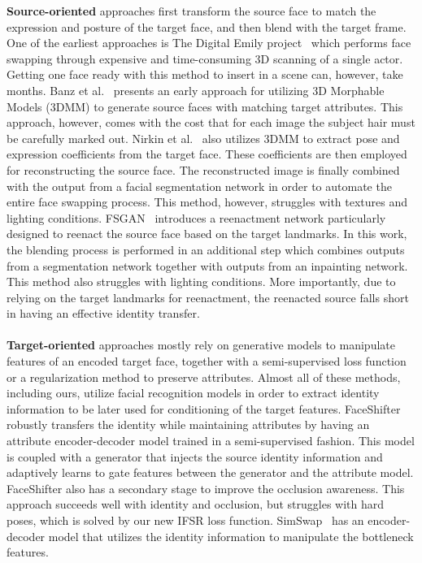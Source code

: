 \documentclass[10pt,twocolumn,letterpaper]{article}
\begin{document}
\textbf{Source-oriented} approaches first transform the source face to match the expression and posture of the target face, and then blend with the target frame. One of the earliest approaches is The Digital Emily project~\cite{3d_emily} which performs face swapping through expensive and time-consuming 3D scanning of a single actor. Getting one face ready with this method to insert in a scene can, however, take months. Banz et al.~\cite{faceexchange} presents an early approach for utilizing 3D Morphable Models (3DMM) \cite{3dmm} to generate source faces with matching target attributes. This approach, however, comes with the cost that for each image the subject hair must be carefully marked out. 
Nirkin et al.~\cite{nirkin} also utilizes 3DMM to extract pose and expression coefficients from the target face. These coefficients are then employed for reconstructing the source face. The   reconstructed image is finally combined with  the output from a facial segmentation network in order to automate  the entire face swapping process. 
This method, however, struggles with textures and lighting conditions.
FSGAN~\cite{fsgan} introduces a reenactment network particularly designed to reenact the source face based on the target landmarks. In this work, the blending process is performed in an additional step which combines outputs from a segmentation network together with outputs from an inpainting network. This method also struggles with lighting conditions. More importantly, due to relying on the target landmarks for reenactment, the reenacted source falls short in having an effective identity transfer.
\\
\\
\textbf{Target-oriented} approaches mostly rely on generative models to manipulate features of an encoded target face, together with a semi-supervised loss function  or a regularization method to preserve  attributes. Almost all of these methods, including ours, utilize facial recognition models in order to extract identity information to be later used for conditioning of the target features. 
FaceShifter~\cite{faceshifter} robustly transfers the identity  while maintaining  attributes by having an attribute encoder-decoder model trained in a semi-supervised fashion.
This model is coupled with a generator that injects the source identity information and adaptively learns to gate features between the generator and the attribute model.
FaceShifter also has a secondary stage to improve the occlusion awareness. This approach succeeds well with identity and occlusion, but struggles with hard poses, which is solved by our new IFSR loss function. SimSwap~\cite{simswap} has an encoder-decoder model that utilizes the identity information to manipulate the bottleneck features.
\end{document}
